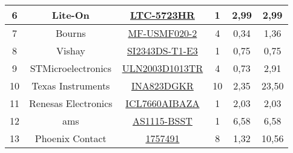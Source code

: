 \begin{table}[H]
\begin{tabular}{|c|c|c|c|c|c|}
6                    & Lite-On             & \href{https://componentsearchengine.com/Datasheets/1/LTC-5723HR.pdf}{LTC-5723HR}                                                                                                                                       & 1        & 2,99            & 2,99            \\ \hline
7                    & Bourns              & \href{https://www.bourns.com/docs/Product-Datasheets/mfusmf.pdf}{MF-USMF020-2}                                                                                                                                         & 4        & 0,34            & 1,36            \\ \hline
8                    & Vishay              & \href{https://www.vishay.com/docs/72079/si2343ds.pdf}{SI2343DS-T1-E3}                                                                                                                                                  & 1        & 0,75            & 0,75            \\ \hline
9                    & STMicroelectronics  & \href{http://www.st.com/st-web-ui/static/active/en/resource/technical/document/datasheet/CD00001244.pdf}{ULN2003D1013TR}                                                                                               & 4        & 0,73            & 2,91            \\ \hline
10                   & Texas Instruments   & \href{https://www.ti.com/lit/ds/symlink/ina823.pdf}{INA823DGKR}                                                                                                                                                        & 10       & 2,35            & 23,50           \\ \hline
11                   & Renesas Electronics & \href{https://www.renesas.com/en-us/www/doc/datasheet/icl7660s-a.pdf}{ICL7660AIBAZA}                                                                                                                                   & 1        & 2,03            & 2,03            \\ \hline
12                   & ams                 & \href{https://datasheet.datasheetarchive.com/originals/distributors/Datasheets-SFU1/DSASFU10002655.pdf}{AS1115-BSST}                                                                                                   & 1        & 6,58            & 6,58            \\ \hline
13                   & Phoenix Contact     & \href{http://www.phoenixcontact.com/de/produkte/1757491/pdf}{1757491}                                                                                                                                                  & 8        & 1,32            & 10,56           \\ \hline

\end{tabular}
\end{table}
